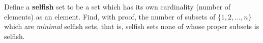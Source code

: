 Define a \textbf{selfish} set to be a set which has its own
cardinality (number of elements) as an element. Find, with proof, the
number of subsets of $\{1, 2, \ldots, n\}$ which are \textit{minimal}
selfish sets, that is, selfish sets none of whose proper subsets is selfish.

